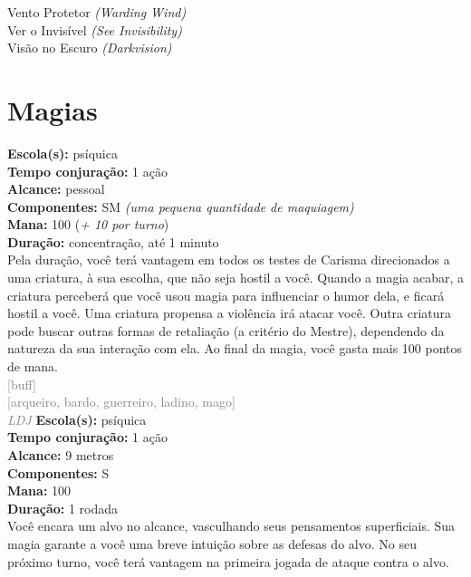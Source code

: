 \documentclass{RPG_Adventure}[2021/10/20]
\begin{document}
{\normalsize Vento Protetor \textit{(Warding Wind)}\\ }
{\normalsize Ver o Invisível \textit{(See Invisibility)}\\ }
{\normalsize Visão no Escuro \textit{(Darkvision)}\\ }
\jump\chapter{Magias}\n\n{}
{\small \t \textbf{Escola(s):} psíquica\\\t \textbf{Tempo conjuração:} 1 ação\\\t \textbf{Alcance:} pessoal\\\t \textbf{Componentes:} SM \textit{(uma pequena quantidade de maquiagem)}\\\t \textbf{Mana:} 100 (\textit{+ 10 por turno})\\\t \textbf{Duração:} concentração, até 1 minuto\\}
{\normalsize Pela duração, você terá vantagem em todos os testes de Carisma direcionados a uma criatura, à sua escolha, que não seja hostil a você. Quando a magia acabar, a criatura perceberá que você usou magia para influenciar o humor dela, e ficará hostil a você. Uma criatura propensa a violência irá atacar você. Outra criatura pode buscar outras formas de retaliação (a critério do Mestre), dependendo da natureza da sua interação com ela. Ao final da magia, você gasta mais 100 pontos de mana.\\}
{\scriptsize \textcolor{gray}{[buff]\\}}
{\scriptsize \textcolor{gray}{[arqueiro, bardo, guerreiro, ladino, mago]\\}}
{\tiny \textcolor{gray}{\textit{LDJ}}}\jump{}
{\small \t \textbf{Escola(s):} psíquica\\\t \textbf{Tempo conjuração:} 1 ação\\\t \textbf{Alcance:} 9 metros\\\t \textbf{Componentes:} S\\\t \textbf{Mana:} 100\\\t \textbf{Duração:} 1 rodada\\}
{\normalsize Você encara um alvo no alcance, vasculhando seus pensamentos superficiais. Sua magia garante a você uma breve intuição sobre as defesas do alvo. No seu próximo turno, você terá vantagem na primeira jogada de ataque contra o alvo.\\}
\end{document}
